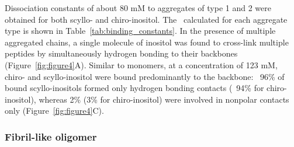 Dissociation constants of about 80 mM to aggregates of type 1 and 2 were obtained for both scyllo- and chiro-inositol. The \KD\  calculated for each aggregate type is shown in Table~\ref{tab:binding_constants}. In the presence of multiple aggregated chains, a single molecule of inositol was found to cross-link multiple peptides by simultaneously hydrogen bonding to their backbones (Figure~\ref{fig:figure4}A). Similar to monomers, at a concentration of 123 mM, chiro- and scyllo-inositol were bound predominantly to the backbone: ~96\% of bound scyllo-inositols formed only hydrogen bonding contacts (~94\% for chiro-inositol), whereas 2\% (3\% for chiro-inositol) were involved in nonpolar contacts only (Figure~\ref{fig:figure4}C).

\subsubsection{Fibril-like oligomer} %

